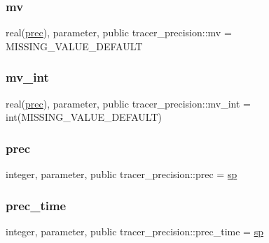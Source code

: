 \subsubsection{\texorpdfstring{mv}{mv}}
{\footnotesize\ttfamily real(\mbox{\hyperlink{namespacetracer__precision_a8a01094f67c69ab389329d205a7c4cc6}{prec}}), parameter, public tracer\+\_\+precision\+::mv = M\+I\+S\+S\+I\+N\+G\+\_\+\+V\+A\+L\+U\+E\+\_\+\+D\+E\+F\+A\+U\+LT}

\mbox{\label{namespacetracer__precision_abddd3613902872af708334a2c29dc468}} 
\subsubsection{\texorpdfstring{mv\+\_\+int}{mv\_int}}
{\footnotesize\ttfamily real(\mbox{\hyperlink{namespacetracer__precision_a8a01094f67c69ab389329d205a7c4cc6}{prec}}), parameter, public tracer\+\_\+precision\+::mv\+\_\+int = int(M\+I\+S\+S\+I\+N\+G\+\_\+\+V\+A\+L\+U\+E\+\_\+\+D\+E\+F\+A\+U\+LT)}

\mbox{\label{namespacetracer__precision_a8a01094f67c69ab389329d205a7c4cc6}} 
\subsubsection{\texorpdfstring{prec}{prec}}
{\footnotesize\ttfamily integer, parameter, public tracer\+\_\+precision\+::prec = \mbox{\hyperlink{namespacetracer__precision_aaa3f9cb7ed44699611a16d61ca9131fb}{sp}}}

\mbox{\label{namespacetracer__precision_acd72fad1267e87137f00ec7d21d5a0cb}} 
\subsubsection{\texorpdfstring{prec\+\_\+time}{prec\_time}}
{\footnotesize\ttfamily integer, parameter, public tracer\+\_\+precision\+::prec\+\_\+time = \mbox{\hyperlink{namespacetracer__precision_aaa3f9cb7ed44699611a16d61ca9131fb}{sp}}}

